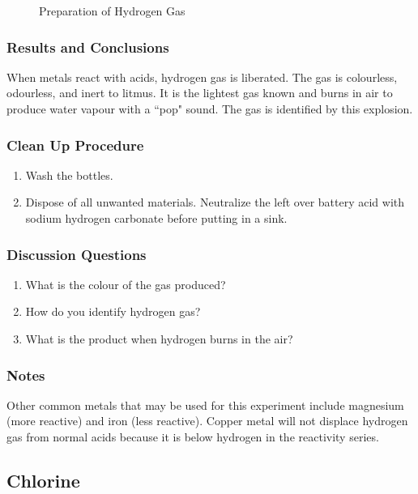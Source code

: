 \begin{figure}[h]
\begin{center}
\def\svgwidth{220pt}

\caption{Preparation of Hydrogen Gas}
\end{center}
\end{figure}

\subsubsection*{Results and Conclusions}
When metals react with acids, hydrogen gas is liberated. The gas is colourless, odourless, and inert to litmus. It is the lightest gas known and burns in air to produce water vapour with a ``pop" sound. The gas is identified by this explosion.

\subsubsection*{Clean Up Procedure}
\begin{enumerate}
\item{Wash the bottles.}
\item{Dispose of all unwanted materials. Neutralize the left over battery acid with sodium hydrogen carbonate before putting in a sink.}
\end{enumerate}

\subsubsection*{Discussion Questions}
\begin{enumerate}
\item{What is the colour of the gas produced?}
\item{How do you identify hydrogen gas?}
\item{What is the product when hydrogen burns in the air?}
\end{enumerate}

\subsubsection*{Notes}
Other common metals that may be used for this experiment include magnesium (more reactive) and iron (less reactive). Copper metal will not displace hydrogen gas from normal acids because it is below hydrogen in the reactivity series.

\subsection{Chlorine}

